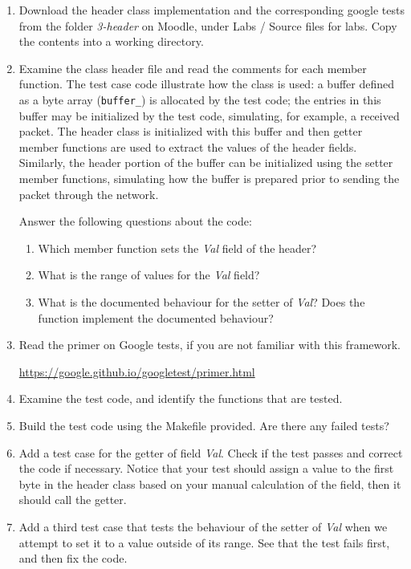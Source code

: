 \documentclass[12pt]{book}
\begin{document}
\begin{enumerate}[resume*]
\item Download the header class implementation and the corresponding google tests from the folder \emph{3-header} on Moodle, under Labs / Source files for labs. Copy the contents into a working directory.

\item Examine the class header file and read the comments for each member function. The test case code illustrate how the class is used: a buffer defined as a byte array (\lstinline$buffer_$) is allocated by the test code; the entries in this buffer may be initialized by the test code, simulating, for example, a received packet. The header class is initialized with this buffer and then getter member functions are used to extract the values of the header fields. Similarly, the header portion of the buffer can be initialized using the setter member functions, simulating how the buffer is prepared prior to sending the packet through the network.

Answer the following questions about the code:
\begin{enumerate}[label=(\alph*)]
\item Which member function sets the \emph{Val} field of the header?
\item What is the range of values for the \emph{Val} field?
\item What is the documented behaviour for the setter of \emph{Val}? Does the function implement the documented behaviour?
\end{enumerate}
  
\item Read the primer on Google tests, if you are not familiar with this framework.

  \url{https://google.github.io/googletest/primer.html}

\item Examine the test code, and identify the functions that are tested.

\item Build the test code using the Makefile provided. Are there any failed tests?

\item Add a test case for the getter of field \emph{Val}. Check if the test passes and correct the code if necessary. Notice that your test should assign a value to the first byte in the header class based on your manual calculation of the field, then it should call the getter.

\item Add a third test case that tests the behaviour of the setter of \emph{Val} when we attempt to set it to a value outside of its range. See that the test fails first, and then fix the code.
\end{enumerate}
\end{document}
